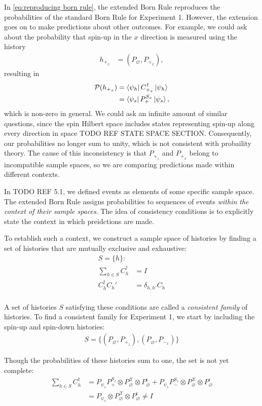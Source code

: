 In \autoref{eq:reproducing born rule}, the extended Born Rule reproduces the probabilities of the standard Born Rule for Experiment 1. However, the extension goes on to make predictions about other outcomes. For example, we could ask about the probability that spin-up in the $x$ direction is measured using the history
\begin{align}
  h_{+_x} &= (P_\varnothing ,P_{+_x}),
\end{align}
resulting in
\begin{align}
  \mathcal{P}(h_{+_x}) &= \bra{\psi_h} C^\dagger_{+_x} \ket{\psi_h}  \\ \nonumber
  &= \bra{\psi_s} P^{S_x}_+ \ket{\psi_s},
\end{align}
which is non-zero in general. We could ask an infinite amount of similar questions, since the spin Hilbert space includes states representing spin-up along every direction in space TODO REF STATE SPACE SECTION. Consequently, our probabilities no longer sum to unity, which is not consistent with probaility theory. The cause of this inconsistency is that $P_{+_z}$ and $P_{+_x}$ belong to incompatible sample spaces, so we are comparing predictions made within different contexts.

In TODO REF 5.1, we defined events as elements of some specific sample space. The extended Born Rule assigns probabilities to sequences of events \textit{within the context of their sample spaces}. The idea of consistency conditions is to explicitly state the context in which preidctions are made.

To establish such a context, we construct a sample space of histories by finding a set of histories that are mutually exclusive and exhaustive:
\begin{align}
  S = \{h \}: \\ \nonumber
  \sum_{h \in S} C_h^\dagger &= I \\ \nonumber
  C_h^\dagger C_h' &= \delta_{h,h'} C_h \\
\end{align}

A set of histories $S$ satisfying these conditions are called a \textit{consistent family} of histories. To find a consistent family for Experiment 1, we start by including the spin-up and spin-down histories:
\begin{align}
  S = \{ \left(P_\varnothing, P_{+_z} \right), \left(P_\varnothing, P_{-_x} \right)\}
\end{align}

Though the probabilities of these histories sum to one, the set is not yet complete:
\begin{align}
  \sum_{h \in S} C_h^\dagger &= P_{\psi_s} P^{S_z}_+ \otimes P^\mathcal{X}_\varnothing \otimes P^\epsilon_\varnothing + P_{\psi_s} P^{S_z}_- \otimes P^\mathcal{X}_\varnothing \otimes P^\epsilon_\varnothing \\ \nonumber
  &= P_{\psi_s} \otimes P^\mathcal{X}_\varnothing \otimes P^\epsilon_\varnothing \neq I
\end{align}


